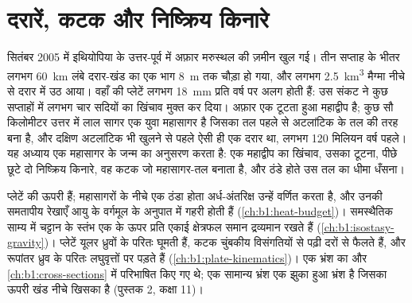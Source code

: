 \chapter{दरारें, कटक और निष्क्रिय किनारे}\label{ch:b1:rifts-ridges-margins}

सितंबर 2005 में इथियोपिया के उत्तर-पूर्व में अफ़ार मरुस्थल की ज़मीन खुल गई। तीन सप्ताह के भीतर लगभग \qty{60}{km} लंबे दरार-खंड का एक भाग \qty{8}{m} तक चौड़ा हो गया, और लगभग \qty{2.5}{km^3} मैग्मा नीचे से दरार में उठ आया। वहाँ की प्लेटें लगभग \qty{18}{mm} प्रति वर्ष पर अलग होती हैं: उस संकट ने कुछ सप्ताहों में लगभग चार सदियों का खिंचाव मुक्त कर दिया। अफ़ार एक टूटता हुआ महाद्वीप है; कुछ सौ किलोमीटर उत्तर में लाल सागर एक युवा महासागर है जिसका तल पहले से अटलांटिक के तल की तरह बना है, और दक्षिण अटलांटिक भी खुलने से पहले ऐसी ही एक दरार था, लगभग 120 मिलियन वर्ष पहले। यह अध्याय एक महासागर के जन्म का अनुसरण करता है: एक महाद्वीप का खिंचाव, उसका टूटना, पीछे छूटे दो निष्क्रिय किनारे, वह कटक जो महासागर-तल बनाता है, और ठंडे होते उस तल का धीमा धँसना।

\begin{recall}
प्लेटें  की ऊपरी  हैं; महासागरों के नीचे एक ठंडा होता अर्ध-अंतरिक्ष उन्हें वर्णित करता है, और उनकी समतापीय रेखाएँ आयु के वर्गमूल के अनुपात में गहरी होती हैं (\cref{ch:b1:heat-budget})। समस्थैतिक साम्य में चट्टान के स्तंभ एक  के ऊपर प्रति एकाई क्षेत्रफल समान द्रव्यमान रखते हैं (\cref{ch:b1:isostasy-gravity})। प्लेटें यूलर ध्रुवों के परितः घूमती हैं, कटक चुंबकीय विसंगतियों से पढ़ी दरों से फैलते हैं, और रूपांतर ध्रुव के परितः लघुवृत्तों पर पड़ते हैं (\cref{ch:b1:plate-kinematics})। एक भ्रंश का  और  \cref{ch:b1:cross-sections} में परिभाषित किए गए थे; एक सामान्य भ्रंश एक झुका हुआ भ्रंश है जिसका ऊपरी खंड नीचे खिसका है (पुस्तक 2, कक्षा 11)।
\end{recall}

